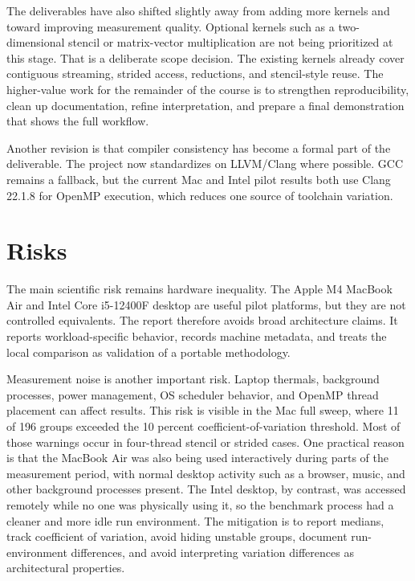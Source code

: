 \documentclass[11pt]{article}
\begin{document}
The deliverables have also shifted slightly away from adding more kernels and toward improving measurement quality. Optional kernels such as a two-dimensional stencil or matrix-vector multiplication are not being prioritized at this stage. That is a deliberate scope decision. The existing kernels already cover contiguous streaming, strided access, reductions, and stencil-style reuse. The higher-value work for the remainder of the course is to strengthen reproducibility, clean up documentation, refine interpretation, and prepare a final demonstration that shows the full workflow.

Another revision is that compiler consistency has become a formal part of the deliverable. The project now standardizes on LLVM/Clang where possible. GCC remains a fallback, but the current Mac and Intel pilot results both use Clang 22.1.8 for OpenMP execution, which reduces one source of toolchain variation.

\section{Risks}

The main scientific risk remains hardware inequality. The Apple M4 MacBook Air and Intel Core i5-12400F desktop are useful pilot platforms, but they are not controlled equivalents. The report therefore avoids broad architecture claims. It reports workload-specific behavior, records machine metadata, and treats the local comparison as validation of a portable methodology.

Measurement noise is another important risk. Laptop thermals, background processes, power management, OS scheduler behavior, and OpenMP thread placement can affect results. This risk is visible in the Mac full sweep, where 11 of 196 groups exceeded the 10 percent coefficient-of-variation threshold. Most of those warnings occur in four-thread stencil or strided cases. One practical reason is that the MacBook Air was also being used interactively during parts of the measurement period, with normal desktop activity such as a browser, music, and other background processes present. The Intel desktop, by contrast, was accessed remotely while no one was physically using it, so the benchmark process had a cleaner and more idle run environment. The mitigation is to report medians, track coefficient of variation, avoid hiding unstable groups, document run-environment differences, and avoid interpreting variation differences as architectural properties.
\end{document}
